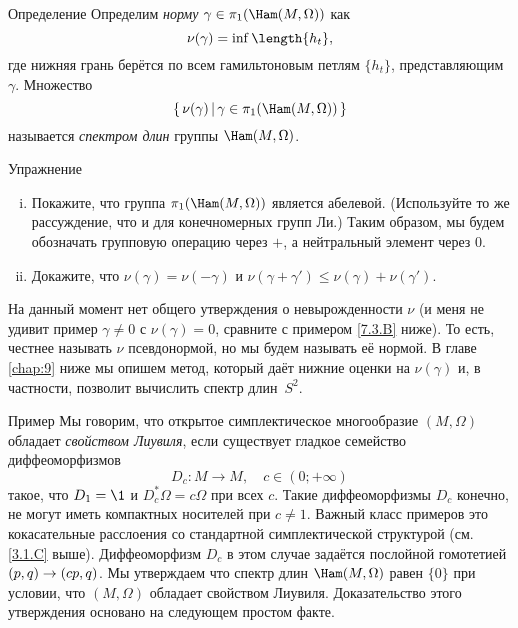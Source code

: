 \begin{ex}{Определение}\label{7.3.A}
Определим {}\emph{норму} $\gamma \in \pi_1 (\Ham (M, \Omega))$ как \index[symb]{$\nu(\gamma)$}
\[\nu(\gamma)=\inf\length\{h_t\},\]
где нижняя грань берётся по всем гамильтоновым петлям $\{h_t\}$, представляющим $\gamma$.
Множество 
\[\set{\nu (\gamma)}{\gamma \in \pi_1 (\Ham (M, \Omega))}\]
называется \emph{спектром длин} группы $\Ham (M, \Omega)$.
\end{ex}

\begin{ex*}{Упражнение}

\begin{enumerate}[(i)]
 \item Покажите, что группа $\pi_1 (\Ham (M, \Omega))$ является абелевой. (Используйте то же рассуждение, что и для конечномерных групп Ли.)
Таким образом, мы будем обозначать групповую операцию через $+$, а нейтральный элемент через $0$.
 \item Докажите, что $\nu (\gamma) = \nu (-\gamma)$ и $\nu (\gamma + \gamma') \le \nu (\gamma) + \nu (\gamma')$.
\end{enumerate}

\end{ex*}

На данный момент нет общего утверждения о невырожденности $\nu$ (и меня не удивит пример $\gamma \ne 0$ с $\nu (\gamma) = 0$, сравните с примером \ref{7.3.B} ниже).
То есть, честнее называть $\nu$ псевдонормой, но мы будем называть её нормой.
В главе \ref{chap:9} ниже мы опишем метод, который даёт нижние оценки на $\nu (\gamma)$ и, в частности, позволит вычислить спектр длин~$S^2$.

\begin{ex}{Пример}\label{7.3.B}
Мы говорим, что открытое симплектическое многообразие $(M, \Omega)$ обладает \emph{свойством Лиувиля}, если существует гладкое семейство диффеоморфизмов
\[D_c: M \to M,\quad c \in (0; + \infty)\]
такое, что $D_1 = \1$ и $D_c^\ast \Omega = c\Omega$ при всех $c$.
Такие диффеоморфизмы $D_c$ конечно, не могут иметь компактных носителей при $c \ne 1$.
Важный класс примеров это кокасательные расслоения со стандартной
симплектической структурой (см. \ref{3.1.C} выше).
Диффеоморфизм $D_c$ в этом случае задаётся послойной гомотетией $(p, q) \z\to (cp, q)$.
Мы утверждаем что спектр длин $\Ham (M, \Omega)$ равен $\{0\}$ при условии, что $(M, \Omega)$
обладает свойством Лиувиля.
Доказательство этого утверждения основано на следующем простом факте.
\end{ex}

